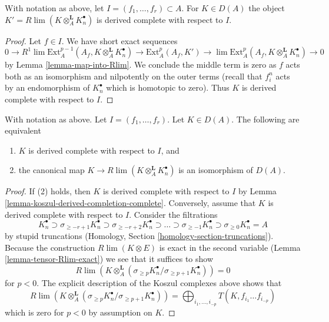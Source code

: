 \begin{lemma}
\label{lemma-koszul-derived-completion-complete}
With notation as above, let $I = (f_1, \ldots, f_r) \subset A$. For
$K \in D(A)$ the object $K' = R\lim (K \otimes_A^\mathbf{L} K_n^\bullet)$
is derived complete with respect to $I$.
\end{lemma}

\begin{proof}
Let $f \in I$. We have short exact sequences
$$
0 \to
R^1\lim \text{Ext}^{p - 1}_A(A_f, K \otimes_A^\mathbf{L} K_n^\bullet) \to
\text{Ext}^p_A(A_f, K') \to
\lim \text{Ext}^p_A(A_f, K \otimes_A^\mathbf{L} K_n^\bullet) \to 0
$$
by Lemma \ref{lemma-map-into-Rlim}. We conclude the middle term is zero
as $f$ acts both as an isomorphism and nilpotently on the outer terms
(recall that $f_i^n$ acts by an endomorphism of $K_n^\bullet$ which is
homotopic to zero). Thus $K$ is derived complete with respect to $I$.
\end{proof}

\begin{lemma}
\label{lemma-characterize-derived-complete-Koszul}
With notation as above. Let $I = (f_1, \ldots, f_r)$.
Let $K \in D(A)$. The following are equivalent
\begin{enumerate}
\item $K$ is derived complete with respect to $I$, and
\item the canonical map $K \to R\lim (K \otimes_A^\mathbf{L} K_n^\bullet)$
is an isomorphism of $D(A)$.
\end{enumerate}
\end{lemma}

\begin{proof}
If (2) holds, then $K$ is derived complete with respect to $I$
by Lemma \ref{lemma-koszul-derived-completion-complete}.
Conversely, assume that $K$ is derived complete with respect to $I$.
Consider the filtrations
$$
K_n^\bullet \supset
\sigma_{\geq -r + 1}K_n^\bullet \supset
\sigma_{\geq -r + 2}K_n^\bullet \supset \ldots \supset
\sigma_{\geq -1}K_n^\bullet \supset
\sigma_{\geq 0}K_n^\bullet = A
$$
by stupid truncations (Homology, Section \ref{homology-section-truncations}).
Because the construction $R\lim(K \otimes E)$ is exact in
the second variable (Lemma \ref{lemma-tensor-Rlim-exact})
we see that it suffices to show
$$
R\lim \left(
K \otimes_A^\mathbf{L}
(\sigma_{\geq p}K_n^\bullet/ \sigma_{\geq p + 1}K_n^\bullet)
\right) = 0
$$
for $p < 0$. The explicit description of the Koszul complexes above
shows that
$$
R\lim \left(
K \otimes_A^\mathbf{L}
(\sigma_{\geq p}K_n^\bullet/ \sigma_{\geq p + 1}K_n^\bullet)
\right) =
\bigoplus\nolimits_{i_1, \ldots, i_{-p}}
T(K, f_{i_1}\ldots f_{i_{-p}})
$$
which is zero for $p < 0$ by assumption on $K$.
\end{proof}

